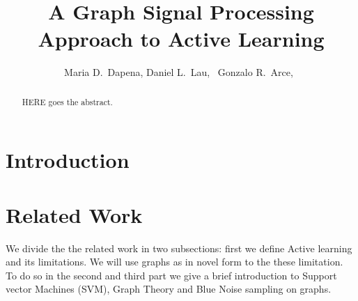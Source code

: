 \documentclass[12 pt]{IEEEtran}
\title{\LARGE A Graph Signal Processing
Approach to Active Learning}
\author{Maria D.~Dapena,
        Daniel L.~Lau,~\IEEEmembership{Member,~IEEE,}
        Gonzalo R.~Arce,~\IEEEmembership{Fellow,~IEEE,}}
\begin{document}
\maketitle

\maketitle
\begin{abstract}
HERE goes the abstract.
\end{abstract}


\IEEEoverridecommandlockouts
\begin{keywords}

\end{keywords}

\IEEEpeerreviewmaketitle



\section{Introduction}
   
 




\section{Related Work}

 We divide the the related work in two subsections: first we define Active learning and its limitations. We will use graphs as  in novel form to the these limitation. To do so in the second and third part  we give a brief introduction  to Support vector Machines (SVM),  Graph Theory and Blue Noise sampling on graphs. 
  
\end{document}

